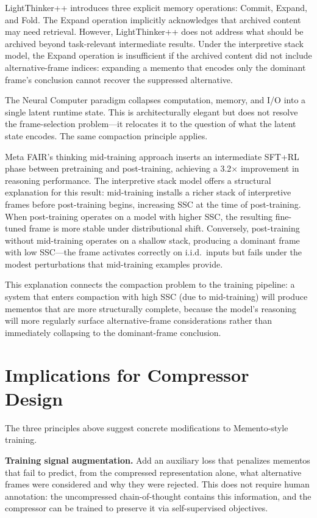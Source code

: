 \documentclass[12pt]{article}
\begin{document}
LightThinker++ \citep{lighttinkerplusplus2026} introduces three explicit
memory operations: Commit, Expand, and Fold. The Expand operation implicitly
acknowledges that archived content may need retrieval. However,
LightThinker++ does not address what should be archived beyond
task-relevant intermediate results. Under the interpretive stack model,
the Expand operation is insufficient if the archived content did not
include alternative-frame indices: expanding a memento that encodes only
the dominant frame's conclusion cannot recover the suppressed alternative.

The Neural Computer paradigm \citep{neuralcomputer2026} collapses
computation, memory, and I/O into a single latent runtime state.
This is architecturally elegant but does not resolve the frame-selection
problem---it relocates it to the question of what the latent state encodes.
The same compaction principle applies.

Meta FAIR's thinking mid-training approach \citep{lanchantin2026midtraining}
inserts an intermediate SFT+RL phase between pretraining and post-training,
achieving a 3.2$\times$ improvement in reasoning performance. The
interpretive stack model offers a structural explanation for this result:
mid-training installs a richer stack of interpretive frames before
post-training begins, increasing SSC at the time of post-training.
When post-training operates on a model with higher SSC, the resulting
fine-tuned frame is more stable under distributional shift.
Conversely, post-training without mid-training operates on a shallow
stack, producing a dominant frame with low SSC---the frame activates
correctly on i.i.d.\ inputs but fails under the modest perturbations
that mid-training examples provide.

This explanation connects the compaction problem to the training pipeline:
a system that enters compaction with high SSC (due to mid-training) will
produce mementos that are more structurally complete, because the model's
reasoning will more regularly surface alternative-frame considerations
rather than immediately collapsing to the dominant-frame conclusion.

\section{Implications for Compressor Design}

The three principles above suggest concrete modifications to Memento-style
training.

\textbf{Training signal augmentation.}
Add an auxiliary loss that penalizes mementos that fail to predict,
from the compressed representation alone, what alternative frames were
considered and why they were rejected. This does not require human
annotation: the uncompressed chain-of-thought contains this information,
and the compressor can be trained to preserve it via self-supervised
objectives.
\end{document}
